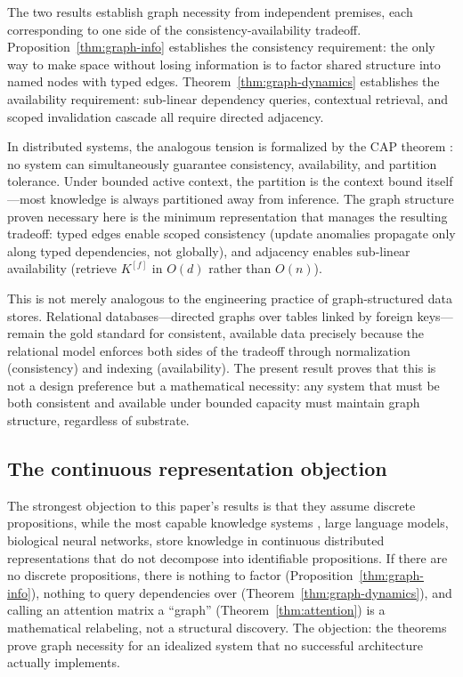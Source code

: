 \documentclass[11pt]{article}
\theoremstyle{definition}
\begin{document}
The two results establish graph necessity from independent premises,
each corresponding to one side of the consistency-availability tradeoff.
Proposition~\ref{thm:graph-info} establishes the consistency
requirement: the only way to make space without losing information is
to factor shared structure into named nodes with typed edges.
Theorem~\ref{thm:graph-dynamics} establishes the availability
requirement: sub-linear dependency queries, contextual retrieval, and
scoped invalidation cascade all require directed adjacency.

In distributed systems, the analogous tension is formalized by the
CAP theorem \cite{Brewer2000}: no system can simultaneously guarantee
consistency, availability, and partition tolerance. Under bounded
active context, the partition is the context bound itself---most
knowledge is always partitioned away from inference. The graph
structure proven necessary here is the minimum representation that
manages the resulting tradeoff: typed edges enable scoped consistency
(update anomalies propagate only along typed dependencies, not
globally), and adjacency enables sub-linear availability (retrieve
$K^{[f]}$ in $O(d)$ rather than $O(n)$).

This is not merely analogous to the engineering practice of
graph-structured data stores. Relational databases---directed graphs
over tables linked by foreign keys---remain the gold standard for
consistent, available data precisely because the relational model
enforces both sides of the tradeoff through normalization (consistency)
and indexing (availability). The present result proves that this is
not a design preference but a mathematical necessity: any system that
must be both consistent and available under bounded capacity must
maintain graph structure, regardless of substrate.

\subsection{The continuous representation objection}

The strongest objection to this paper's results is that they
assume discrete propositions, while the most capable knowledge systems
, large language models, biological neural networks, store
knowledge in continuous distributed representations that do not
decompose into identifiable propositions. If there are no discrete
propositions, there is nothing to factor
(Proposition~\ref{thm:graph-info}), nothing to query dependencies over
(Theorem~\ref{thm:graph-dynamics}), and calling an attention matrix a
``graph'' (Theorem~\ref{thm:attention}) is a mathematical relabeling,
not a structural discovery. The objection: the theorems prove graph
necessity for an idealized system that no successful architecture
actually implements.
\end{document}
